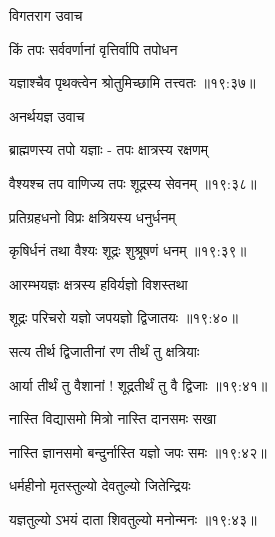 {\devanagarifont विगतराग उवाच {\dandab}\dontdisplaylinenum  }%
 
{\devanagarifont किं तपः सर्ववर्णानां वृत्तिर्वापि तपोधन \thinspace{\danda} \dontdisplaylinenum }%
 

{\devanagarifont यज्ञाश्चैव पृथक्त्वेन श्रोतुमिच्छामि तत्त्वतः {॥१९:३७॥} \veg\dontdisplaylinenum }%
 
{\devanagarifont अनर्थयज्ञ उवाच {\dandab}\dontdisplaylinenum  }%
 
{\devanagarifont ब्राह्मणस्य तपो यज्ञाः - तपः क्षात्रस्य रक्षणम् \thinspace{\danda} \dontdisplaylinenum }%
 

{\devanagarifont वैश्यश्च तप वाणिज्य तपः शूद्रस्य सेवनम् {॥१९:३८॥} \veg\dontdisplaylinenum }%
 
{\devanagarifont प्रतिग्रहधनो विप्रः क्षत्रियस्य धनुर्धनम् \thinspace{\dandab} \dontdisplaylinenum }%
 

{\devanagarifont कृषिर्धनं तथा वैश्यः शूद्रः शुश्रूषणं धनम् {॥१९:३९॥} \veg\dontdisplaylinenum }%
 
{\devanagarifont आरम्भयज्ञः क्षत्रस्य हविर्यज्ञो विशस्तथा \thinspace{\dandab} \dontdisplaylinenum }%


{\devanagarifont शूद्रः परिचरो यज्ञो जपयज्ञो द्विजातयः {॥१९:४०॥} \veg\dontdisplaylinenum }%
 
{\devanagarifont सत्य तीर्थ द्विजातीनां रण तीर्थं तु क्षत्रियाः \thinspace{\dandab} \dontdisplaylinenum }%
 

{\devanagarifont आर्या तीर्थं तु वैशानां ! शूद्रतीर्थं तु वै द्विजाः {॥१९:४१॥} \veg\dontdisplaylinenum }%
 
{\devanagarifont नास्ति विद्यासमो मित्रो नास्ति दानसमः सखा \thinspace{\dandab} \dontdisplaylinenum }%
 

{\devanagarifont नास्ति ज्ञानसमो बन्दुर्नास्ति यज्ञो जपः समः {॥१९:४२॥} \veg\dontdisplaylinenum }%
 
{\devanagarifont धर्महीनो मृतस्तुल्यो देवतुल्यो जितेन्द्रियः \thinspace{\dandab} \dontdisplaylinenum }%
 

{\devanagarifont यज्ञतुल्यो ऽभयं दाता शिवतुल्यो मनोन्मनः {॥१९:४३॥} \veg\dontdisplaylinenum }%
 
